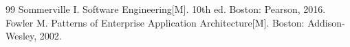 \clearpage
{}
{}
\begin{thebibliography}{99}
 Sommerville I. Software Engineering[M]. 10th ed. Boston: Pearson, 2016.
 Fowler M. Patterns of Enterprise Application Architecture[M]. Boston: Addison-Wesley, 2002.
\end{thebibliography}

